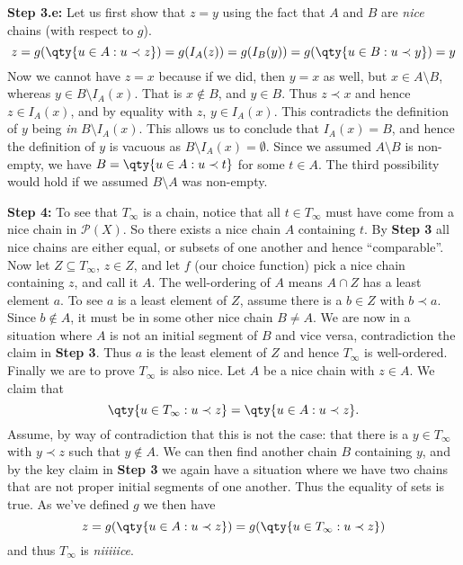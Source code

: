 \documentclass[boxes,pages,color=CornflowerBlue]{homework}
\begin{document}
\begin{solution}
    \textbf{Step 3.e:}
    Let us first show that $z = y$ using the fact that $A$ and $B$ are \emph{nice} chains (with respect to $g$).
    \begin{equation*}
        z = g(\qty{u \in A : u \prec z}) = g(I_A(z)) = g(I_B(y)) = g(\qty{u \in B : u \prec y}) = y
    \end{equation*}
    Now we cannot have $z = x$ because if we did, then $y = x$ as well, but $x \in A\setminus B$, whereas $y \in B\setminus I_A(x)$.
    That is $x \notin B$, and $y\in B$.
    Thus $z \prec x$ and hence $z \in I_A(x)$, and by equality with $z$, $y\in I_A(x)$.
    This contradicts the definition of $y$ being \emph{in} $B\setminus I_A(x)$.
    This allows us to conclude that $I_A(x) = B$, and hence the definition of $y$ is vacuous as $B\setminus I_A(x) = \emptyset$.
    Since we assumed $A\setminus B$ is non-empty, we have $B = \qty{u\in A : u \prec t}$ for some $t\in A$.
    The third possibility would hold if we assumed $B\setminus A$ was non-empty.

    \textbf{Step 4:} To see that $T_\infty$ is a chain, notice that all $t\in T_\infty$ must have come from a nice chain in $\mathcal{P}(X)$.
    So there exists a nice chain $A$ containing $t$.
    By \textbf{Step 3} all nice chains are either equal, or subsets of one another and hence ``comparable''.
    Now let $Z\subseteq T_\infty$, $z\in Z$, and let $f$ (our choice function) pick a nice chain containing $z$, and call it $A$.
    The well-ordering of $A$ means $A\cap Z$ has a least element $a$.
    To see $a$ is a least element of $Z$, assume there is a $b\in Z$ with $b\prec a$.
    Since $b\notin A$, it must be in some other nice chain $B \neq A$.
    We are now in a situation where $A$ is not an initial segment of $B$ and vice versa, contradiction the claim in \textbf{Step 3}.
    Thus $a$ is the least element of $Z$ and hence $T_\infty$ is well-ordered.
    Finally we are to prove $T_\infty$ is also nice.
    Let $A$ be a nice chain with $z \in A$.
    We claim that
    \begin{equation*}
        \qty{u\in T_\infty : u\prec z} = \qty{u \in A : u \prec z}.
    \end{equation*}
    Assume, by way of contradiction that this is not the case: that there is a $y\in T_\infty$ with $y\prec z$ such that $y\notin A$.
    We can then find another chain $B$ containing $y$, and by the key claim in \textbf{Step 3} we again have a situation where we have two chains that are not proper initial segments of one another.
    Thus the equality of sets is true.
    As we've defined $g$ we then have
    \begin{equation*}
        z = g(\qty{u \in A : u\prec z}) = g(\qty{u \in T_\infty : u\prec z})
    \end{equation*}
    and thus $T_\infty$ is \emph{niiiiice}.


\end{solution}
\end{document}
